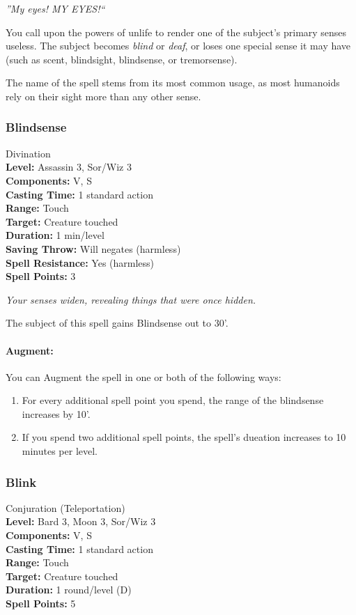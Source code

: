 \emph{''My eyes! MY EYES!``}

You call upon the powers of unlife to render one of the subject's primary senses useless.
The subject becomes \emph{blind} or \emph{deaf}, or loses one special sense it may have (such as scent, blindsight, blindsense, or tremorsense). 

The name of the spell stems from its most common usage, as most humanoids rely on their sight more than any other sense.
\subsubsection{Blindsense}
\label{Spell:Blindsense}
Divination
\\ \textbf{Level:} Assassin 3, Sor/Wiz 3
\\ \textbf{Components:} V, S
\\ \textbf{Casting Time:} 1 standard action
\\ \textbf{Range:} Touch
\\ \textbf{Target:} Creature touched
\\ \textbf{Duration:} 1 min/level
\\ \textbf{Saving Throw:} Will negates (harmless)
\\ \textbf{Spell Resistance:} Yes (harmless)
\\ \textbf{Spell Points:} 3

\emph{Your senses widen, revealing things that were once hidden.}

The subject of this spell gains Blindsense out to 30'. 

\paragraph{Augment:} You can Augment the spell in one or both of the following ways:
\begin{enumerate}
 \item For every additional spell point you spend, the range of the blindsense increases by 10'.
 \item If you spend two additional spell points, the spell's dueation increases to 10 minutes per level.
\end{enumerate}

\subsubsection{Blink}
\label{Spell:Blink}
Conjuration (Teleportation)
\\ \textbf{Level:} Bard 3, Moon 3, Sor/Wiz 3
\\ \textbf{Components:} V, S
\\ \textbf{Casting Time:} 1 standard action
\\ \textbf{Range:} Touch
\\ \textbf{Target:} Creature touched
\\ \textbf{Duration:} 1 round/level (D)
\\ \textbf{Spell Points:} 5


